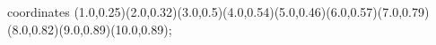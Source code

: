 					coordinates { (1.0,0.25)(2.0,0.32)(3.0,0.5)(4.0,0.54)(5.0,0.46)(6.0,0.57)(7.0,0.79)(8.0,0.82)(9.0,0.89)(10.0,0.89)};